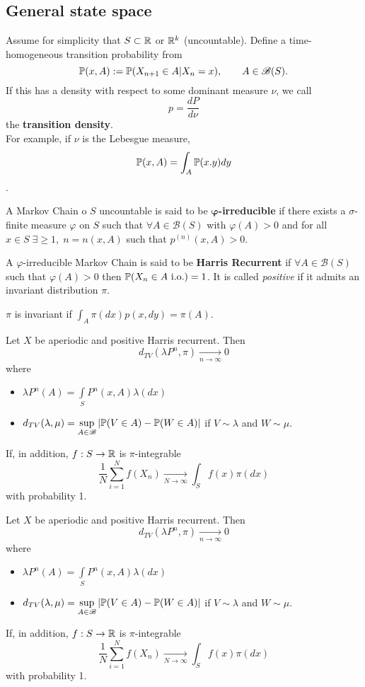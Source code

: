 \documentclass{article}
\begin{document}
	\subsection{General state space}
	Assume for simplicity that $S\subset\mathbb{R}$ or $\mathbb{R}^k$ (uncountable). Define a time-homogeneous transition probability from 
	\[\mathbb{P}(x,A):=\mathbb{P}(X_{n+1}\in A|X_n=x),\qquad A\in\mathscr{B}(S).\]
	If this has a density with respect to some dominant measure $\nu$, we call
	\[p=\frac{dP}{d\nu}\]
	the \textbf{transition density}.\\
	For example, if $\nu$ is the Lebesgue measure,
	\[\mathbb{P}(x,A)=\int_A \mathbb{P}(x.y)dy\].
	\begin{definition}
		A Markov Chain o $S$ uncountable is said to be $\mathbf{\varphi}$\textbf{-irreducible} if there exists a $\sigma$-finite measure $\varphi$ on $S$ such that $\forall A\in\mathscr{B}(S)$ with $\varphi(A)>0$ and for all $x\in S\;\exists\geqslant1,\;n=n(x,A)$ such that $p^{(n)}(x,A)>0$.
	\end{definition}
	\begin{definition}
		A $\varphi$-irreducible Markov Chain is said to be \textbf{Harris Recurrent} if $\forall A \in \mathscr{B}(S)$ such that $\varphi(A)>0$ then $\mathbb{P}(X_n\in A \text{ i.o.})=1$. It is called \textit{positive} if it admits an invariant distribution $\pi$.
	\end{definition}
	$\pi$ is invariant if $\int_A\pi(dx)p(x,dy)=\pi(A)$.
	\begin{theorem}
		Let $X$ be aperiodic and positive Harris recurrent. Then
		\[d_{TV}(\lambda P^n,\pi)\xrightarrow[n\to\infty]{}0
		\]
		where
		\begin{itemize}
			\item $\displaystyle\lambda P^n(A)=\int\limits_SP^n(x,A)\lambda(dx)$
			\item $\displaystyle d_{TV}(\lambda,\mu)=\sup\limits_{A\in\mathscr{B}}|\mathbb{P}(V\in A)-\mathbb{P}(W\in A)|$ if $V\sim\lambda$ and $W\sim\mu$.
		\end{itemize}
		If, in addition, $f:S\to\mathbb{R}$ is $\pi$-integrable
		\[
		\frac{1}{N}\sum_{i=1}^Nf(X_n)\xrightarrow[N\to\infty]{}\int_Sf(x)\pi(dx)
		\]
		with probability 1.
	\end{theorem}
	\begin{definition}
		Let $X$ be aperiodic and positive Harris recurrent. Then
		\[d_{TV}(\lambda P^n,\pi)\xrightarrow[n\to\infty]{}0
		\]
		where
		\begin{itemize}
			\item $\displaystyle\lambda P^n(A)=\int\limits_SP^n(x,A)\lambda(dx)$
			\item $\displaystyle d_{TV}(\lambda,\mu)=\sup\limits_{A\in\mathscr{B}}|\mathbb{P}(V\in A)-\mathbb{P}(W\in A)|$ if $V\sim\lambda$ and $W\sim\mu$.
		\end{itemize}
		If, in addition, $f:S\to\mathbb{R}$ is $\pi$-integrable
		\[
		\frac{1}{N}\sum_{i=1}^Nf(X_n)\xrightarrow[N\to\infty]{}\int_Sf(x)\pi(dx)
		\]
		with probability 1.
	\end{definition}
\end{document}
